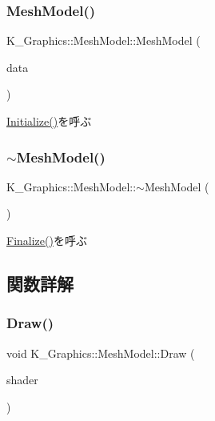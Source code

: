 \subsubsection{\texorpdfstring{Mesh\+Model()}{MeshModel()}}
{\footnotesize\ttfamily K\+\_\+\+Graphics\+::\+Mesh\+Model\+::\+Mesh\+Model (\begin{DoxyParamCaption}\item[{\mbox{\hyperlink{struct_k___graphics_1_1_model_datas}{Model\+Datas}} $\ast$}]{data }\end{DoxyParamCaption})}



\mbox{\hyperlink{class_k___graphics_1_1_mesh_model_a637186b0c2c238605024c1ac04b74fa5}{Initialize()}}を呼ぶ 

\mbox{\label{class_k___graphics_1_1_mesh_model_a1cad4b0768077d36ab31fdfdff1e3e61}} 
\subsubsection{\texorpdfstring{$\sim$\+Mesh\+Model()}{~MeshModel()}}
{\footnotesize\ttfamily K\+\_\+\+Graphics\+::\+Mesh\+Model\+::$\sim$\+Mesh\+Model (\begin{DoxyParamCaption}{ }\end{DoxyParamCaption})}



\mbox{\hyperlink{class_k___graphics_1_1_mesh_model_a22ec15af1fc136d17ef87293acc1e4a7}{Finalize()}}を呼ぶ 



\subsection{関数詳解}
\mbox{\label{class_k___graphics_1_1_mesh_model_a2f3e54e2d4edaf4d54744446971447f3}} 
\subsubsection{\texorpdfstring{Draw()}{Draw()}}
{\footnotesize\ttfamily void K\+\_\+\+Graphics\+::\+Mesh\+Model\+::\+Draw (\begin{DoxyParamCaption}\item[{\mbox{\hyperlink{class_k___graphics_1_1_shader_class}{Shader\+Class}} $\ast$}]{shader }\end{DoxyParamCaption})}



